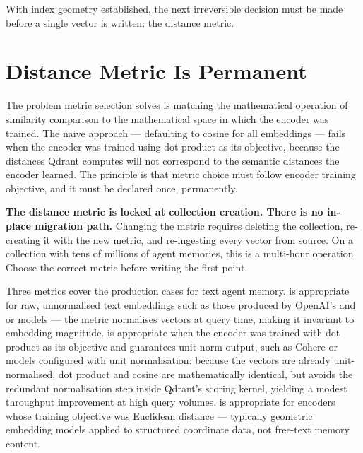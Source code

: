 With index geometry established, the next irreversible decision must be made
before a single vector is written: the distance metric.


\section{Distance Metric Is Permanent}
\label{sec:metric-commitment}

The problem metric selection solves is matching the mathematical operation
of similarity comparison to the mathematical space in which the encoder
was trained. The naive approach --- defaulting to cosine for all embeddings ---
fails when the encoder was trained using dot product as its objective,
because the distances Qdrant computes will not correspond to the semantic
distances the encoder learned. The principle is that metric choice must
follow encoder training objective, and it must be declared once, permanently.

\begin{warningbox}
\textbf{The distance metric is locked at collection creation. There is no
in-place migration path.} Changing the metric requires deleting the collection,
re-creating it with the new metric, and re-ingesting every vector from source.
On a collection with tens of millions of agent memories, this is a multi-hour
operation. Choose the correct metric before writing the first point.
\end{warningbox}

Three metrics cover the production cases for text agent memory. 
is appropriate for raw, unnormalised text embeddings such as those produced by
OpenAI's  and  or
 models --- the metric normalises vectors at query
time, making it invariant to embedding magnitude.  is appropriate
when the encoder was trained with dot product as its objective and guarantees
unit-norm output, such as Cohere  or  models
configured with unit normalisation: because the vectors are already
unit-normalised, dot product and cosine are mathematically identical, but
 avoids the redundant normalisation step inside Qdrant's scoring
kernel, yielding a modest throughput improvement at high query volumes.
 is appropriate for encoders whose training objective was
Euclidean distance --- typically geometric embedding models applied to
structured coordinate data, not free-text memory content.

